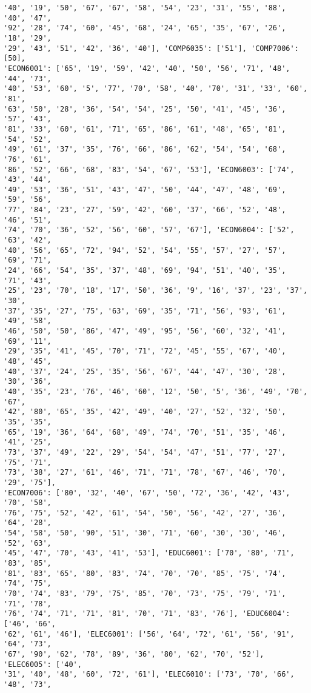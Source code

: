 \documentclass[11pt]{article}
\begin{document}
\begin{Verbatim}[commandchars=\\\{\}]
'40', '19', '50', '67', '67', '58', '54', '23', '31', '55', '88', '40', '47',
'92', '28', '74', '60', '45', '68', '24', '65', '35', '67', '26', '18', '29',
'29', '43', '51', '42', '36', '40'], 'COMP6035': ['51'], 'COMP7006': [50],
'ECON6001': ['65', '19', '59', '42', '40', '50', '56', '71', '48', '44', '73',
'40', '53', '60', '5', '77', '70', '58', '40', '70', '31', '33', '60', '81',
'63', '50', '28', '36', '54', '54', '25', '50', '41', '45', '36', '57', '43',
'81', '33', '60', '61', '71', '65', '86', '61', '48', '65', '81', '54', '52',
'49', '61', '37', '35', '76', '66', '86', '62', '54', '54', '68', '76', '61',
'86', '52', '66', '68', '83', '54', '67', '53'], 'ECON6003': ['74', '43', '44',
'49', '53', '36', '51', '43', '47', '50', '44', '47', '48', '69', '59', '56',
'77', '84', '23', '27', '59', '42', '60', '37', '66', '52', '48', '46', '51',
'74', '70', '36', '52', '56', '60', '57', '67'], 'ECON6004': ['52', '63', '42',
'40', '56', '65', '72', '94', '52', '54', '55', '57', '27', '57', '69', '71',
'24', '66', '54', '35', '37', '48', '69', '94', '51', '40', '35', '71', '43',
'25', '23', '70', '18', '17', '50', '36', '9', '16', '37', '23', '37', '30',
'37', '35', '27', '75', '63', '69', '35', '71', '56', '93', '61', '49', '58',
'46', '50', '50', '86', '47', '49', '95', '56', '60', '32', '41', '69', '11',
'29', '35', '41', '45', '70', '71', '72', '45', '55', '67', '40', '48', '45',
'40', '37', '24', '25', '35', '56', '67', '44', '47', '30', '28', '30', '36',
'40', '35', '23', '76', '46', '60', '12', '50', '5', '36', '49', '70', '67',
'42', '80', '65', '35', '42', '49', '40', '27', '52', '32', '50', '35', '35',
'65', '19', '36', '64', '68', '49', '74', '70', '51', '35', '46', '41', '25',
'73', '37', '49', '22', '29', '54', '54', '47', '51', '77', '27', '75', '71',
'73', '38', '27', '61', '46', '71', '71', '78', '67', '46', '70', '29', '75'],
'ECON7006': ['80', '32', '40', '67', '50', '72', '36', '42', '43', '70', '58',
'76', '75', '52', '42', '61', '54', '50', '56', '42', '27', '36', '64', '28',
'54', '58', '50', '90', '51', '30', '71', '60', '30', '30', '46', '52', '63',
'45', '47', '70', '43', '41', '53'], 'EDUC6001': ['70', '80', '71', '83', '85',
'81', '83', '65', '80', '83', '74', '70', '70', '85', '75', '74', '74', '75',
'70', '74', '83', '79', '75', '85', '70', '73', '75', '79', '71', '71', '78',
'76', '74', '71', '71', '81', '70', '71', '83', '76'], 'EDUC6004': ['46', '66',
'62', '61', '46'], 'ELEC6001': ['56', '64', '72', '61', '56', '91', '64', '73',
'67', '90', '62', '78', '89', '36', '80', '62', '70', '52'], 'ELEC6005': ['40',
'31', '40', '48', '60', '72', '61'], 'ELEC6010': ['73', '70', '66', '48', '73',

\end{Verbatim}
\end{document}

